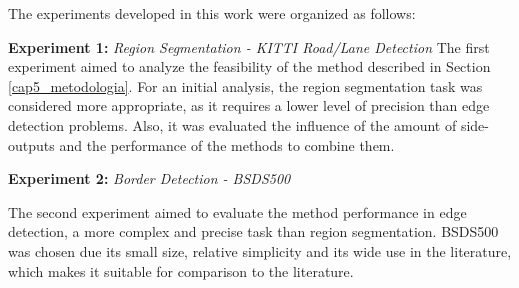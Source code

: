 The experiments developed in this work were organized as follows:

\textbf{Experiment 1:} \textit{Region Segmentation - KITTI Road/Lane Detection}
The first experiment aimed to analyze the feasibility of the method described in Section \ref{cap5_metodologia}.
For an initial analysis, the region segmentation task was considered more appropriate, as it requires a lower level of precision than edge detection problems.
Also, it was evaluated the influence of the amount of side-outputs and the performance of the methods to combine them.

\textbf{Experiment 2:} \textit{Border Detection - BSDS500}

The second experiment aimed to evaluate the method performance  in edge detection, a more complex and precise task than region segmentation.
BSDS500 was chosen due its small size, relative simplicity and its wide use in the literature, which makes it suitable for comparison to the literature.
